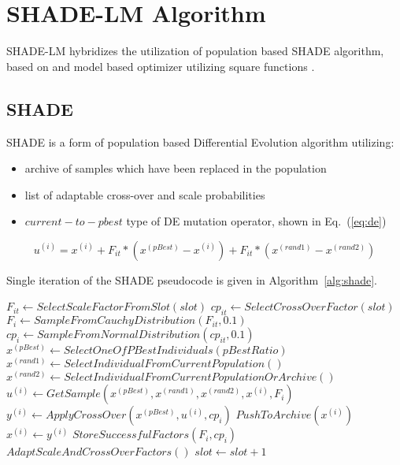 \documentclass[manuscript]{acmart}
\begin{document}
\section{SHADE-LM Algorithm}

SHADE-LM hybridizes the utilization of population based SHADE
algorithm, based on \cite{Tanabe2014} and model based optimizer
utilizing square functions \cite{zaborski2020analysis}.

\subsection{SHADE}

SHADE is a form of population based Differential Evolution algorithm utilizing:
\begin{itemize}
	\item archive of samples which have been replaced in the population
	\item list of adaptable cross-over and scale probabilities
	\item $current-to-pbest$ type of DE mutation operator, shown in Eq.~(\ref{eq:de}) 
\end{itemize}

\begin{equation}
	u^{(i)} = x^{(i)} + F_{it} * (x^{(pBest)} - x^{(i)}) + F_{it} * (x^{(rand1)} - x^{(rand2)})
	\label{eq:de}
\end{equation}

Single iteration of the SHADE pseudocode is given in Algorithm~\ref{alg:shade}.

\begin{algorithm}[ht]
	\begin{algorithmic}[1]
	\footnotesize
	\State $F_{it} \gets SelectScaleFactorFromSlot(slot)$
	\State $cp_{it} \gets SelectCrossOverFactor(slot)$
		\State $F_{i} \gets SampleFromCauchyDistribution(F_{it}, 0.1)$ \label{alg:shade:line:params-get}
		\State $cp_{i} \gets SampleFromNormalDistribution(cp_{it}, 0.1)$
		\State $x^{(pBest)} \gets SelectOneOfPBestIndividuals(pBestRatio)$
		\State $x^{(rand1)} \gets SelectIndividualFromCurrentPopulation()$
		\State $x^{(rand2)} \gets SelectIndividualFromCurrentPopulationOrArchive()$
		\State $u^{(i)} \gets GetSample(x^{(pBest)}, x^{(rand1)}, x^{(rand2)}, x^{(i)}, F_{i})$
		\State $y^{(i)} \gets ApplyCrossOver(x^{(pBest)}, u^{(i)}, cp_{i})$ \label{alg:shade:line:samples-get}
			\State $PushToArchive(x^{(i)})$
			\State $x^{(i)} \gets y^{(i)}$
			\State $StoreSuccessfulFactors(F_{i}, cp_{i})$ \label{alg:shade:line:store-factor}
		\EndIf
	\EndFor
	\State $AdaptScaleAndCrossOverFactors()$
	\State $slot \gets slot + 1$
\caption{Single iteration of SHADE%
  \label{alg:shade}}
  \end{algorithmic}
  \end{algorithm}
\end{document}
